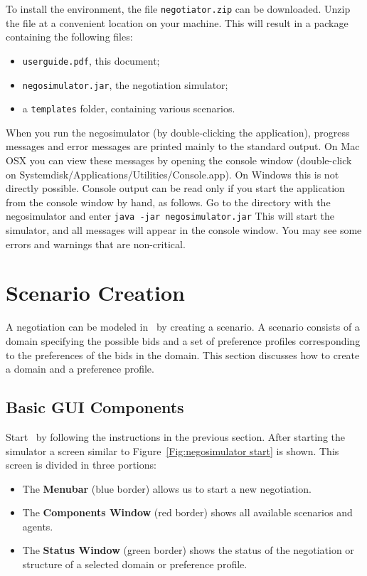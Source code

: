 \documentclass[]{article}
\begin{document}
To install the environment, the file \texttt{negotiator.zip} can be downloaded. Unzip the file at a convenient location on your machine. This will result in a package containing the following files:

\begin{itemize}
	\item \texttt{userguide.pdf}, this document;
	\item \texttt{negosimulator.jar}, the negotiation simulator;
	\item a \texttt{templates} folder, containing various scenarios.
\end{itemize}

When you run the negosimulator (by double-clicking the application), progress messages and error messages are printed mainly to the standard output. On Mac OSX you can view these messages by opening the console window (double-click on Systemdisk/Applications/Utilities/Console.app). On Windows this is not directly possible. Console output can be read only if you start the application from the console window by hand, as follows. Go to the directory with the negosimulator and enter
\texttt{java -jar negosimulator.jar}
This will start the simulator, and all messages will appear in the console window. You may see some errors and warnings that are non-critical.

\section{Scenario Creation}
A negotiation can be modeled in \Genius~by creating a scenario. A scenario consists of a domain specifying the possible bids and a set of preference profiles corresponding to the preferences of the bids in the domain. This section discusses how to create a domain and a preference profile.

\subsection{Basic GUI Components}
Start \Genius~by following the instructions in the previous section. After starting the simulator a screen similar to Figure~\ref{Fig:negosimulator start} is shown. This screen is divided in three portions:

\begin{itemize}
	\item The \textbf{Menubar} (blue border) allows us to start a new negotiation.
	\item The \textbf{Components Window} (red border) shows all available scenarios and agents.
	\item The \textbf{Status Window} (green border) shows the status of the negotiation or structure of a selected domain or preference profile.
\end{itemize}
\end{document}
